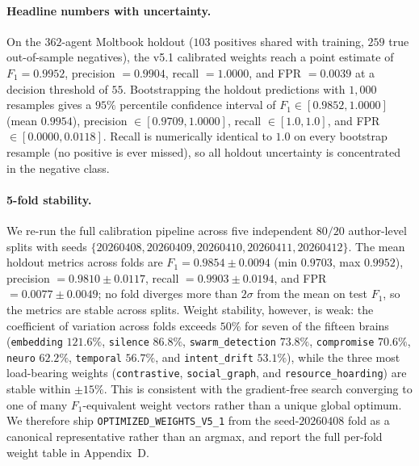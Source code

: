 \documentclass{article}
\begin{document}
\paragraph{Headline numbers with uncertainty.}
On the $362$-agent Moltbook holdout ($103$ positives shared with
training, $259$ true out-of-sample negatives), the v5.1 calibrated
weights reach a point estimate of $F_1 = 0.9952$, precision
$= 0.9904$, recall $= 1.0000$, and FPR $= 0.0039$ at a decision
threshold of $55$. Bootstrapping the holdout predictions with
$1{,}000$ resamples gives a $95\%$ percentile confidence interval
of $F_1 \in [0.9852, 1.0000]$ (mean $0.9954$), precision
$\in [0.9709, 1.0000]$, recall $\in [1.0, 1.0]$, and
FPR $\in [0.0000, 0.0118]$. Recall is numerically identical to $1.0$
on every bootstrap resample (no positive is ever missed), so all
holdout uncertainty is concentrated in the negative class.

\paragraph{5-fold stability.}
We re-run the full calibration pipeline across five independent
$80/20$ author-level splits with seeds
$\{20260408, 20260409, 20260410, 20260411, 20260412\}$. The mean
holdout metrics across folds are
$F_1 = 0.9854 \pm 0.0094$ (min $0.9703$, max $0.9952$),
precision $= 0.9810 \pm 0.0117$,
recall $= 0.9903 \pm 0.0194$, and
FPR $= 0.0077 \pm 0.0049$; no fold diverges more than $2\sigma$
from the mean on test $F_1$, so the metrics are stable across splits.
Weight stability, however, is weak: the coefficient of variation
across folds exceeds $50\%$ for seven of the fifteen brains
(\texttt{embedding} $121.6\%$, \texttt{silence} $86.8\%$,
\texttt{swarm\_detection} $73.8\%$, \texttt{compromise} $70.6\%$,
\texttt{neuro} $62.2\%$, \texttt{temporal} $56.7\%$, and
\texttt{intent\_drift} $53.1\%$), while the three most load-bearing
weights (\texttt{contrastive}, \texttt{social\_graph}, and
\texttt{resource\_hoarding}) are stable within $\pm 15\%$. This is
consistent with the gradient-free search converging to one of many
$F_1$-equivalent weight vectors rather than a unique global optimum.
We therefore ship \texttt{OPTIMIZED\_WEIGHTS\_V5\_1} from the
seed-$20260408$ fold as a canonical representative rather than an
argmax, and report the full per-fold weight table in Appendix~D.
\end{document}
